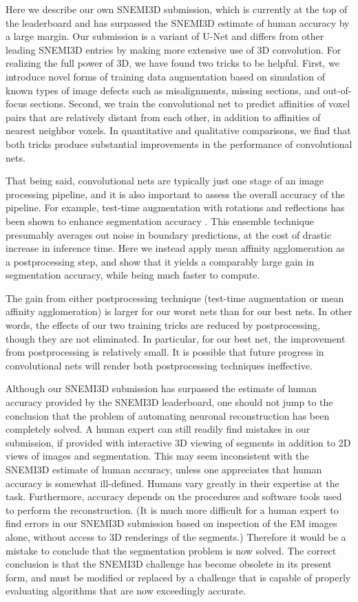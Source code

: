 \documentclass{article}
\begin{document}
Here we describe our own SNEMI3D submission, which is currently at the top of
the leaderboard and has surpassed the SNEMI3D estimate of human accuracy by a
large margin.  Our submission is a variant of U-Net \cite{ronneberger2015} and
differs from other leading SNEMI3D entries \cite{zeng2017,beier2017} by making
more extensive use of 3D convolution.  For realizing the full power of 3D, we
have found two tricks to be helpful.  First, we introduce novel forms of
training data augmentation based on simulation of known types of image defects
such as misalignments, missing sections, and out-of-focus sections.  Second, we
train the convolutional net to predict affinities of voxel pairs that are
relatively distant from each other, in addition to affinities of nearest
neighbor voxels.  In quantitative and qualitative comparisons, we find that both
tricks produce substantial improvements in the performance of convolutional
nets.

That being said, convolutional nets are typically just one stage of an image
processing pipeline, and it is also important to assess the overall accuracy of
the pipeline.  For example, test-time augmentation with rotations and
reflections has been shown to enhance segmentation accuracy \cite{zeng2017}.
This ensemble technique presumably averages out noise in boundary predictions,
at the cost of drastic increase in inference time.  Here we instead apply mean
affinity agglomeration as a postprocessing step, and show that it yields a
comparably large gain in segmentation accuracy, while being much faster to
compute.

The gain from either postprocessing technique (test-time augmentation or mean
affinity agglomeration) is larger for our worst nets than for our best nets.  In
other words, the effects of our two training tricks are reduced by
postprocessing, though they are not eliminated. In particular, for our best net,
the improvement from postprocessing is relatively small.  It is possible that
future progress in convolutional nets will render both postprocessing techniques
ineffective.

Although our SNEMI3D submission has surpassed the estimate of human accuracy
provided by the SNEMI3D leaderboard, one should not jump to the conclusion that
the problem of automating neuronal reconstruction has been completely solved. A
human expert can still readily find mistakes in our submission, if provided with
interactive 3D viewing of segments in addition to 2D views of images and
segmentation. This may seem inconsistent with the SNEMI3D estimate of human
accuracy, unless one appreciates that human accuracy is somewhat ill-defined.
Humans vary greatly in their expertise at the task. Furthermore, accuracy
depends on the procedures and software tools used to perform the reconstruction.
(It is much more difficult for a human expert to find errors in our SNEMI3D
submission based on inspection of the EM images alone, without access to 3D
renderings of the segments.) Therefore it would be a mistake to conclude that
the segmentation problem is now solved. The correct conclusion is that the
SNEMI3D challenge has become obsolete in its present form, and must be modified
or replaced by a challenge that is capable of properly evaluating algorithms
that are now exceedingly accurate.
\end{document}

